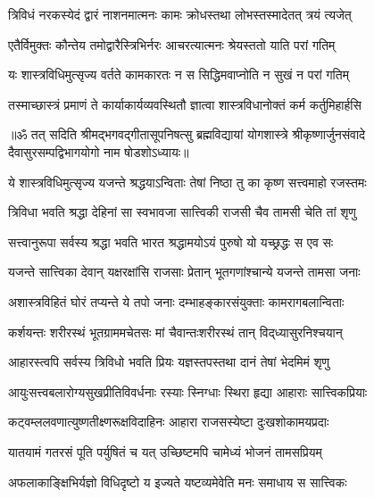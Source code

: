 \twolineshloka
{त्रिविधं नरकस्येदं द्वारं नाशनमात्मनः}
{कामः क्रोधस्तथा लोभस्तस्मादेतत् त्रयं त्यजेत्}%

\twolineshloka
{एतैर्विमुक्तः कौन्तेय तमोद्वारैस्त्रिभिर्नरः}
{आचरत्यात्मनः श्रेयस्ततो याति परां गतिम्}%

\twolineshloka
{यः शास्त्रविधिमुत्सृज्य वर्तते कामकारतः}
{न स सिद्धिमवाप्नोति न सुखं न परां गतिम्}%

\twolineshloka
{तस्माच्छास्त्रं प्रमाणं ते कार्याकार्यव्यवस्थितौ}
{ज्ञात्वा शास्त्रविधानोक्तं कर्म कर्तुमिहार्हसि}%

{॥ॐ तत् सदिति श्रीमद्भगवद्गीतासूपनिषत्सु ब्रह्मविद्यायां योगशास्त्रे श्रीकृष्णार्जुनसंवादे दैवासुरसम्पद्विभागयोगो नाम षोडशोऽध्यायः॥}



\twolineshloka
{ये शास्त्रविधिमुत्सृज्य यजन्ते श्रद्धयाऽन्विताः}
{तेषां निष्ठा तु का कृष्ण सत्त्वमाहो रजस्तमः}%


\twolineshloka
{त्रिविधा भवति श्रद्धा देहिनां सा स्वभावजा}
{सात्त्विकी राजसी चैव तामसी चेति तां शृणु}%

\twolineshloka
{सत्त्वानुरूपा सर्वस्य श्रद्धा भवति भारत}
{श्रद्धामयोऽयं पुरुषो यो यच्छ्रद्धः स एव सः}%

\twolineshloka
{यजन्ते सात्त्विका देवान् यक्षरक्षांसि राजसाः}
{प्रेतान् भूतगणांश्चान्ये यजन्ते तामसा जनाः}%

\twolineshloka
{अशास्त्रविहितं घोरं तप्यन्ते ये तपो जनाः}
{दम्भाहङ्कारसंयुक्ताः कामरागबलान्विताः}%

\twolineshloka
{कर्शयन्तः शरीरस्थं भूतग्राममचेतसः}
{मां चैवान्तःशरीरस्थं तान् विद्‌ध्यासुरनिश्चयान्}%

\twolineshloka
{आहारस्त्वपि सर्वस्य त्रिविधो भवति प्रियः}
{यज्ञस्तपस्तथा दानं तेषां भेदमिमं शृणु}%

\twolineshloka
{आयुःसत्त्वबलारोग्यसुखप्रीतिविवर्धनाः}
{रस्याः स्निग्धाः स्थिरा हृद्या आहाराः सात्त्विकप्रियाः}%

\twolineshloka
{कट्वम्ललवणात्युष्णतीक्ष्णरूक्षविदाहिनः}
{आहारा राजसस्येष्टा दुःखशोकामयप्रदाः}%

\twolineshloka
{यातयामं गतरसं पूति पर्युषितं च यत्}
{उच्छिष्टमपि चामेध्यं भोजनं तामसप्रियम्}%

\twolineshloka
{अफलाकाङ्क्षिभिर्यज्ञो विधिदृष्टो य इज्यते}
{यष्टव्यमेवेति मनः समाधाय स सात्त्विकः}%

